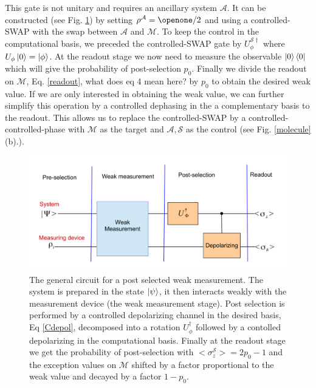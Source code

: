 \documentclass[aps,pra,12pt,onecolumn,showpacs,superscriptaddress,floatfix,footinbib,subfigure]{revtex4}
\def\bra#1{\mathinner{\langle{#1}|}}
\def\ket#1{\mathinner{|{#1}\rangle}}
\def\es{{\mathcal{S}}}
\def\md{{\mathcal{M}}}
\def\ea{{\mathcal{A}}}
\def\kb#1{\ket{#1}\bra{#1}}
\begin{document}
This gate is not unitary and requires an ancillary system $\ea$. It can be  constructed (see Fig. \ref{circuit}) by setting $\rho^\ea=\openone/2$ and using a controlled-SWAP with the swap between $\ea$ and $\md$. To keep the control in the computational basis, we  preceded the controlled-SWAP gate by $U_\phi^{\es\dagger}$ where $U_\phi\ket{0}=\ket{\phi}$.  At the readout stage we now need to measure the observable $\kb{0}$ which will give the probability of post-selection $p_0$. Finally we divide the readout on $\md$, Eq. \eqref{readout}, {\color{red} what does eq 4 mean here?} by $p_0$ to obtain the desired weak value. If we are  only interested in obtaining the weak value, we can further simplify this operation by a controlled dephasing in the a complementary basis to the readout. This allows us to replace the controlled-SWAP by a controlled-controlled-phase with $\md$ as the target and $\ea,\es$ as the control (see Fig. \ref{molecule}(b).).


\begin{figure}[h] \centering

\includegraphics[width=\columnwidth]{Theory.pdf}
\caption{The general circuit for a post selected weak measurement. The system is prepared in the state $\ket{\psi}$, it then interacts weakly with the measurement device (the weak measurement stage). Post selection is performed by a controlled depolarizing channel in the desired basis, Eq \eqref{Cdepol}, decomposed into a rotation $U^\dagger_\phi$ followed by a contolled depolarizing in the computational basis. Finally at the readout stage we get the probability of post-selection with  $<\sigma_z^\es>=2p_0-1$ and the exception values on $\md$  shifted by a factor proportional to the weak value and decayed by a factor $1-p_0$. }\label{circuit}
\end{figure}

\end{document}
